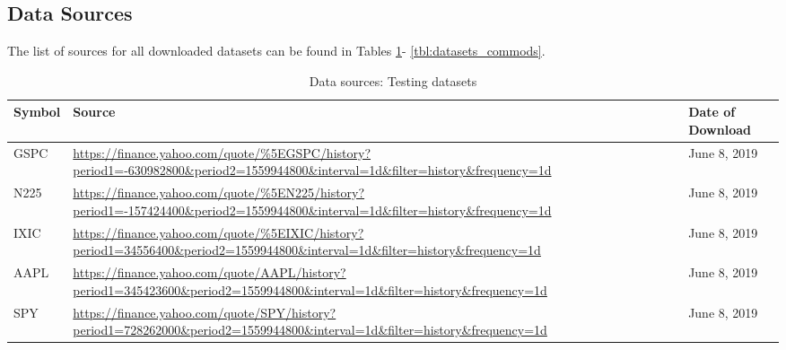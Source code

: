 \documentclass[11pt, a4paper]{article}
\begin{document}
\subsection{Data Sources}

The list of sources for all downloaded datasets can be found in Tables \ref{tbl:datasets_main}- \ref{tbl:datasets_commods}.

\begin{table}[H]
    \centering
        \begin{tabular}{p{3.0cm} p{10.0cm}l}
        \hline
        \textbf{Symbol}                                                             & \textbf{Source}                                                                                                                                              & \textbf{Date of Download} \\ \hline
       GSPC                                                                        & \url{https://finance.yahoo.com/quote/\%5EGSPC/history?period1=-630982800\&period2=1559944800\&interval=1d\&filter=history\&frequency=1d}    & June 8, 2019              \\
        N225                                                                        & \url{https://finance.yahoo.com/quote/\%5EN225/history?period1=-157424400\&period2=1559944800\&interval=1d\&filter=history\&frequency=1d}    & June 8, 2019              \\
        IXIC                                                                        & \url{https://finance.yahoo.com/quote/\%5EIXIC/history?period1=34556400\&period2=1559944800\&interval=1d\&filter=history\&frequency=1d}      & June 8, 2019              \\
        AAPL                                                                        & \url{https://finance.yahoo.com/quote/AAPL/history?period1=345423600\&period2=1559944800\&interval=1d\&filter=history\&frequency=1d}         & June 8, 2019              \\
        SPY                                                                         & \url{https://finance.yahoo.com/quote/SPY/history?period1=728262000\&period2=1559944800\&interval=1d\&filter=history\&frequency=1d}          & June 8, 2019              \\ \hline
        \end{tabular}
        \caption{Data sources: Testing datasets}
    \label{tbl:datasets_main}
\end{table}
\end{document}

